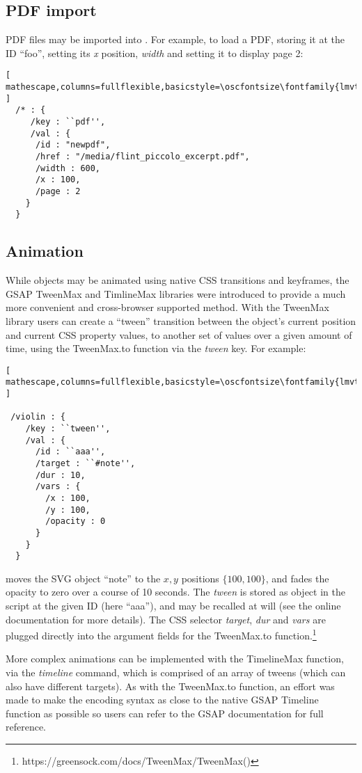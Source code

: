 \subsection{PDF import}\label{sec:pdf}
PDF files may be imported into \drawsocket.
For example, to load a PDF, storing it at the \drawsocket ID ``foo'', setting its \textit{x} position, \textit{width} and setting it to display page 2:

\begin{lstlisting}[ mathescape,columns=fullflexible,basicstyle=\oscfontsize\fontfamily{lmvtt}\selectfont ]
  /* : {
     /key : ``pdf'',
     /val : {
      /id : "newpdf",
      /href : "/media/flint_piccolo_excerpt.pdf",
      /width : 600,
      /x : 100,
      /page : 2
    }
  }
 \end{lstlisting}


\subsection{Animation}\label{sec:animation}
While \drawsocket objects may be animated using native CSS transitions and keyframes, the GSAP TweenMax and TimlineMax libraries were introduced to provide a much more convenient and cross-browser supported method.
With the TweenMax library users can create a ``tween'' transition between the object's current position and current CSS property values, to another set of values over a given amount of time, using the TweenMax.to function via the \textit{tween} \drawsocket key. For example:
\begin{lstlisting}[ mathescape,columns=fullflexible,basicstyle=\oscfontsize\fontfamily{lmvtt}\selectfont ]

 /violin : {
    /key : ``tween'',
    /val : {
      /id : ``aaa'',
      /target : ``#note'', 
      /dur : 10,
      /vars : {
        /x : 100,
        /y : 100,
        /opacity : 0
      }
    }
  }
 \end{lstlisting}
\noindent
moves the SVG object ``note'' to the ${x,y}$ positions $\{100,100\}$, and fades the opacity to zero over a course of 10 seconds.
The \textit{tween} is stored as object in the \drawsocket script at the given ID (here ``aaa''), and may be recalled at will (see the online documentation for more details).
The CSS selector \textit{target}, \textit{dur} and \textit{vars} are plugged directly into the argument fields for the TweenMax.to function.\footnote{https://greensock.com/docs/TweenMax/TweenMax()}

More complex animations can be implemented with the TimelineMax function, via the \drawsocket \textit{timeline} command, which is comprised of an array of tweens (which can also have different targets).
As with the TweenMax.to function, an effort was made to make the encoding syntax as close to the native GSAP Timeline function as possible so users can refer to the GSAP documentation for full reference.

